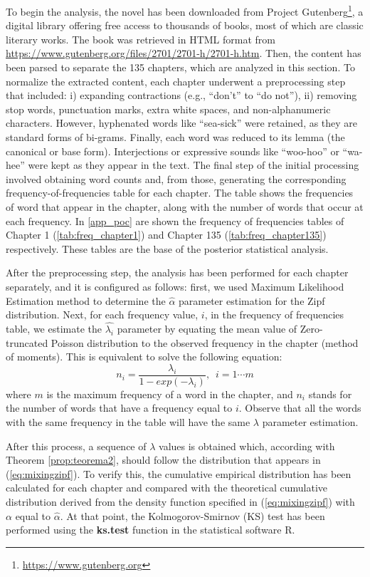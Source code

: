 \documentclass{article}
\begin{document}
To begin the analysis,  the novel has been downloaded from Project Gutenberg\footnote{\url{https://www.gutenberg.org}}, a digital library offering free access to thousands of books, most of which are classic literary works. The book was retrieved in HTML format from \url{https://www.gutenberg.org/files/2701/2701-h/2701-h.htm}. Then, the content has been parsed  to separate the 135 chapters, which are analyzed in this section.
To normalize the extracted content, each chapter underwent a preprocessing step that included: i) expanding contractions (e.g., ``don’t'' to ``do not''), ii) removing stop words, punctuation marks, extra white spaces, and non-alphanumeric characters. However, hyphenated words like ``sea-sick'' were retained, as they are standard forms of bi-grams. Finally, each word was reduced to its lemma (the canonical or base form). Interjections or expressive sounds like ``woo-hoo'' or ``wa-hee'' were kept as they appear in the text.  
The final step of the initial processing involved obtaining word counts and, from those, generating the corresponding frequency-of-frequencies table for each chapter. The table shows the frequencies of word that appear in the chapter, along with the number of words that occur at each frequency. In \ref{app_poc} are shown the frequency of frequencies tables of Chapter 1 (\ref{tab:freq_chapter1}) and Chapter 135 (\ref{tab:freq_chapter135}) respectively. These tables are the base of the posterior statistical analysis.

After the preprocessing step, the analysis has been performed for each chapter separately, and it is configured as follows: first, we used Maximum Likelihood Estimation method  to determine the $\hat{\alpha}$ parameter estimation for the Zipf distribution. Next, for each frequency value, $i$, in the frequency of frequencies table, we estimate the $\hat{\lambda_i}$ parameter by equating the mean value of Zero-truncated Poisson distribution to the observed frequency in the chapter (method of moments). This is equivalent to solve the following equation:
\begin{equation*}
    n_i = \frac{\lambda_i}{1 - exp(-\lambda_i)},\,\,\, i=1\cdots m
\end{equation*}
where $m$ is the maximum frequency of a word in the chapter, and
$n_i$ stands for the number of words that have a frequency equal to $i$. Observe that all the words with the same frequency in the table will have the same $\lambda$ parameter estimation.

\noindent After this process,  a sequence of $\lambda$ values is obtained which, according with Theorem \ref{prop:teorema2}, should follow the distribution that appears in (\ref{eq:mixingzipf}). To verify this, the cumulative empirical distribution has been calculated for each chapter and compared with the theoretical cumulative distribution derived from the density function specified in (\ref{eq:mixingzipf}) with $\alpha$ equal to $\hat{\alpha}$. At that point, the Kolmogorov-Smirnov (KS) test has been performed using the \textbf{ks.test} function in the statistical software R. 
\end{document}
